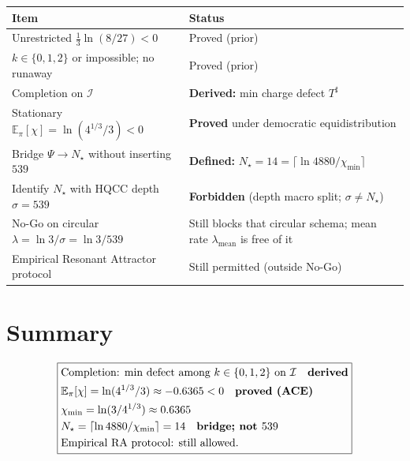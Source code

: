 \begin{center}
\begin{tabular}{@{}p{}p{}@{}}
\toprule
Item & Status \\
\midrule
Unrestricted \(\frac13\ln(8/27)<0\) & Proved (prior) \\
\(k\in\{0,1,2\}\) or impossible; no runaway & Proved (prior) \\
Completion on \(\mathcal{I}\) & \textbf{Derived:} min charge defect \(T^\sharp\) \\
Stationary \(\mathbb{E}_\pi[\chi]=\ln(4^{1/3}/3)<0\) & \textbf{Proved} under democratic equidistribution \\
Bridge \(\Psi\to N_\star\) without inserting \(539\) & \textbf{Defined:} \(N_\star=14=\lceil\ln 4880/\chi_{\min}\rceil\) \\
Identify \(N_\star\) with HQCC depth \(\sigma=539\) & \textbf{Forbidden} (depth macro split; \(\sigma\neq N_\star\)) \\
No-Go on circular \(\lambda=\ln 3/\sigma=\ln 3/539\) & Still blocks that circular schema; mean rate \(\lambda_{\mathrm{mean}}\) is free of it \\
Empirical Resonant Attractor protocol & Still permitted (outside No-Go) \\
\bottomrule
\end{tabular}
\end{center}

\section{Summary}
\label{sec:resolve-summary}

\begin{equation}
\boxed{
\begin{aligned}
&\text{Completion: min defect among }k\in\{0,1,2\}\text{ on }\mathcal{I}
\quad\text{\textbf{derived}}
\\
&\mathbb{E}_\pi[\chi]=\ln(4^{1/3}/3)\approx -0.6365<0
\quad\text{\textbf{proved (ACE)}}
\\
&\chi_{\min}=\ln(3/4^{1/3})\approx 0.6365
\\
&N_\star=\lceil\ln 4880/\chi_{\min}\rceil=14
\quad\text{\textbf{bridge; not }539}
\\
&\text{Empirical RA protocol: still allowed.}
\end{aligned}
}
\end{equation}

